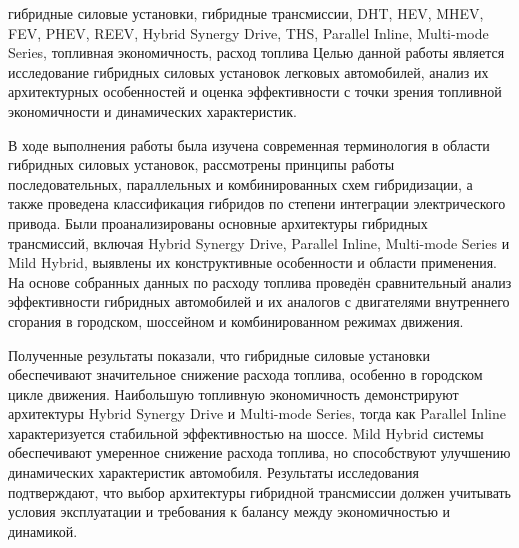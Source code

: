 
\begin{essay}{гибридные силовые установки, гибридные трансмиссии, DHT, HEV, MHEV, FEV, PHEV, REEV, Hybrid Synergy Drive, THS, Parallel Inline, Multi-mode Series, топливная экономичность, расход топлива}
Целью данной работы является исследование гибридных силовых установок легковых автомобилей, анализ их архитектурных особенностей и оценка эффективности с точки зрения топливной экономичности и динамических характеристик.

В ходе выполнения работы была изучена современная терминология в области гибридных силовых установок, рассмотрены принципы работы последовательных, параллельных и комбинированных схем гибридизации, а также проведена классификация гибридов по степени интеграции электрического привода. Были проанализированы основные архитектуры гибридных трансмиссий, включая Hybrid Synergy Drive, Parallel Inline, Multi-mode Series и Mild Hybrid, выявлены их конструктивные особенности и области применения. На основе собранных данных по расходу топлива проведён сравнительный анализ эффективности гибридных автомобилей и их аналогов с двигателями внутреннего сгорания в городском, шоссейном и комбинированном режимах движения.

Полученные результаты показали, что гибридные силовые установки обеспечивают значительное снижение расхода топлива, особенно в городском цикле движения. Наибольшую топливную экономичность демонстрируют архитектуры Hybrid Synergy Drive и Multi-mode Series, тогда как Parallel Inline характеризуется стабильной эффективностью на шоссе. Mild Hybrid системы обеспечивают умеренное снижение расхода топлива, но способствуют улучшению динамических характеристик автомобиля. Результаты исследования подтверждают, что выбор архитектуры гибридной трансмиссии должен учитывать условия эксплуатации и требования к балансу между экономичностью и динамикой.

\end{essay}

